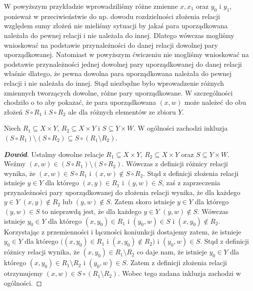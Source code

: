 \begin{remark}
W powyższym przykładzie wprowadziliśmy różne zmienne $x,x_{1}$ oraz $y_{0}$ i $y_{1}$, ponieważ w przeciwieństwie do np. dowodu  rozdzielności złożenia relacji względem sumy złożeń nie mieliśmy sytuacji by jakaś para uporządkowana należała do pewnej relacji i nie należała do innej. Dlatego wówczas mogliśmy wnioskować na podstawie przynależności do danej relacji dowolnej pary uporządkowanej. Natomiast w powyższym ćwiczeniu nie mogliśmy wnioskować na podstawie przynależności jednej dowolnej pary uporządkowanej do danej relacji właśnie dlatego, że pewna dowolna para uporządkowana należała do pewnej relacji i nie należała do innej. Stąd niezbędne było wprowadzenie różnych zmiennych tworzących dowolne, różne pary uporządkowane.
W szczególności chodziło o to aby pokazać, że para uporządkowana $(x,w)$ może należeć do obu złożeń $S\circ R_{1}$
i $S\circ R_{2}$ ale dla różnych elementów ze zbioru $Y$.
\end{remark}
\begin{property}
Niech $R_{1}\subseteq X\times Y$, $R_{2}\subseteq X\times Y$ i $S\subseteq Y\times W$. W ogólności zachodzi inkluzja
$(S\circ R_{1})\setminus(S\circ R_{2})\subseteq S\circ(R_{1}\setminus R_{2})$.
\end{property}
\begin{proof}[\textbf{Dowód}]
Ustalmy dowolne relacje $R_{1}\subseteq X\times Y$, $R_{2}\subseteq X\times Y$ oraz $S\subseteq Y\times W$. Weźmy $(x,w)\in(S\circ R_{1})\setminus(S\circ R_{2})$. Wówczas z definicji różnicy relacji wynika, że $(x,w)\in S\circ R_{1}$ i $(x,w)\notin S\circ R_{2}$. Stąd z definicji złożenia relacji istnieje $y\in Y$ dla którego $(x,y)\in R_{1}$ i $(y,w)\in S$, zaś z zaprzeczenia przynależności pary uporządkowanej do złożenia relacji wynika, że dla każdego $y\in Y$ $(x,y)\notin R_{2}$ lub $(y,w)\notin S$. Zatem skoro istnieje $y\in Y$ dla którego $(y,w)\in S$ to nieprawdą jest, że dla każdego $y\in Y$ $(y,w)\notin S$. Wówczas istnieje $y_{0}\in Y$ dla którego $(x,y_{0})\in R_{1}$ i $(y_{0},w)\in S$ i $(x,y_{0})\notin R_{2}$. Korzystając z przemienności i łączności koniunkcji dostajemy zatem, że istnieje $y_{0}\in Y$ dla którego $((x,y_{0})\in R_{1}$ i $(x,y_{0})\notin R_{2})$ i $(y_{0},w)\in S$. Stąd z definicji różnicy relacji wynika, że $(x,y_{0})\in R_{1}\setminus R_{2}$ co daje nam, że istnieje $y_{0}\in Y$ dla którego $(x,y_{0})\in R_{1}\setminus R_{2}$ i $(y_{0},w)\in S$. Zatem z definicji złożenia relacji otrzymujemy $(x,w)\in S\circ(R_{1}\setminus R_{2})$.
Wobec tego zadana inkluzja zachodzi w ogólności.
\end{proof}
